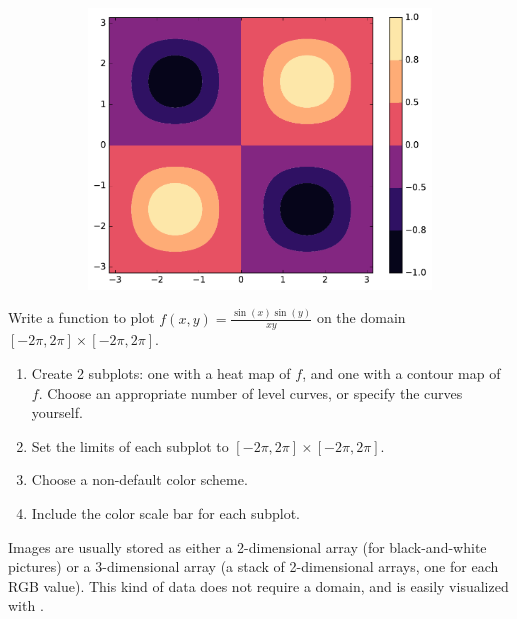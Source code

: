\begin{figure}[H]
\begin{subfigure}{.33\textwidth}
    \centering
    \includegraphics[width=\linewidth]{figures/contourf.pdf}
\end{subfigure}
\end{figure}

\begin{problem} %
\label{prob:heatmap}
Write a function to plot $f(x,y) = \frac{\sin(x)\sin(y)}{xy}$ on the domain $[-2\pi,2\pi] \times [-2\pi,2\pi]$.

\begin{enumerate}
\item Create 2 subplots: one with a heat map of $f$, and one with a contour map of $f$.
Choose an appropriate number of level curves, or specify the curves yourself.
\item Set the limits of each subplot to $[-2\pi,2\pi] \times [-2\pi,2\pi]$.
\item Choose a non-default color scheme.
\item Include the color scale bar for each subplot.
\end{enumerate}
\end{problem}

\begin{info} %
Images are usually stored as either a 2-dimensional array (for black-and-white pictures) or a 3-dimensional array (a stack of 2-dimensional arrays, one for each RGB value).
This kind of data does not require a domain, and is easily visualized with .
\end{info}

